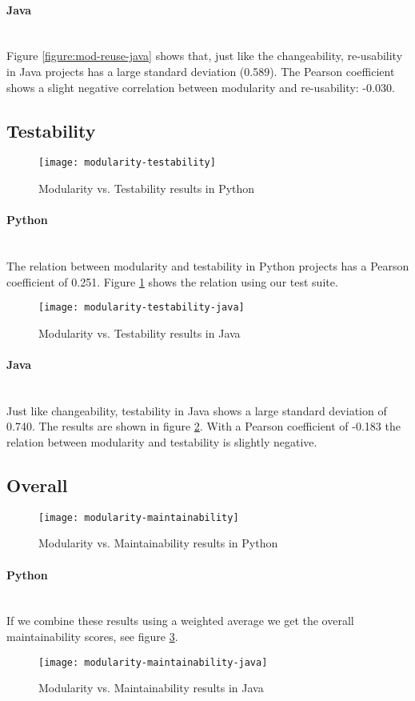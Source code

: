 \documentclass[twoside]{uva-inf-bachelor-thesis}
\newcommand{\myparagraph}[1]{\paragraph{#1}\mbox{}\\}
\begin{document}
\myparagraph{Java}
Figure \ref{figure:mod-reuse-java} shows that, just like the changeability, re-usability in Java projects has a large standard deviation (0.589). The Pearson coefficient shows a slight negative correlation between modularity and re-usability: -0.030.

\subsection{Testability}

\begin{figure}[H]
    \caption{Modularity vs. Testability results in Python}
    \label{figure:mod-test}
    \centering
        \texttt{[image: modularity-testability]}
\end{figure}

\myparagraph{Python}
The relation between modularity and testability in Python projects has a Pearson coefficient of 0.251. Figure \ref{figure:mod-test} shows the relation using our test suite.

\begin{figure}[H]
    \caption{Modularity vs. Testability results in Java}
    \label{figure:mod-test-java}
    \centering
        \texttt{[image: modularity-testability-java]}
\end{figure}

\myparagraph{Java}
Just like changeability, testability in Java shows a large standard deviation of 0.740. The results are shown in figure \ref{figure:mod-test-java}. With a Pearson coefficient of -0.183 the relation between modularity and testability is slightly negative.

\subsection{Overall}
\begin{figure}[H]
    \caption{Modularity vs. Maintainability results in Python}
    \label{figure:mod-main}
    \centering
        \texttt{[image: modularity-maintainability]}
\end{figure}

\myparagraph{Python}
If we combine these results using a weighted average we get the overall maintainability scores, see figure \ref{figure:mod-main}.

\begin{figure}[H]
    \caption{Modularity vs. Maintainability results in Java}
    \label{figure:mod-main-java}
    \centering
        \texttt{[image: modularity-maintainability-java]}
\end{figure}
\end{document}
